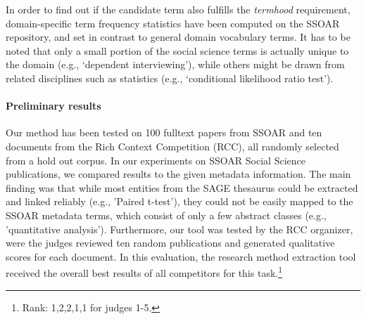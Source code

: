 In order to find out if the candidate term also fulfills the \textit{termhood} requirement, domain-specific term frequency statistics have been computed on the SSOAR repository, and set in contrast to general domain vocabulary terms. 
It has to be noted that only a small portion of the social science terms is actually unique to the domain (e.g., `dependent interviewing'), while others might be drawn from related disciplines such as statistics (e.g., `conditional likelihood ratio test').


\paragraph{Preliminary results}%
Our method has been tested on 100 fulltext papers from SSOAR and ten documents from the Rich Context Competition (RCC), all randomly selected from a hold out corpus.
In our experiments on SSOAR Social Science publications, we compared results to the given metadata information.
The main finding was that while most entities from the SAGE thesaurus could be extracted and linked reliably (e.g., 'Paired t-test'), they could not be easily mapped to the SSOAR metadata terms, which consist of only a few abstract classes (e.g., 'quantitative analysis').
Furthermore, our tool was tested by the RCC organizer, were the judges reviewed ten random publications and generated qualitative scores for each document.
In this evaluation, the research method extraction tool received the overall best results of all competitors for this task.\footnote{Rank: 1,2,2,1,1 for judges 1-5.}




